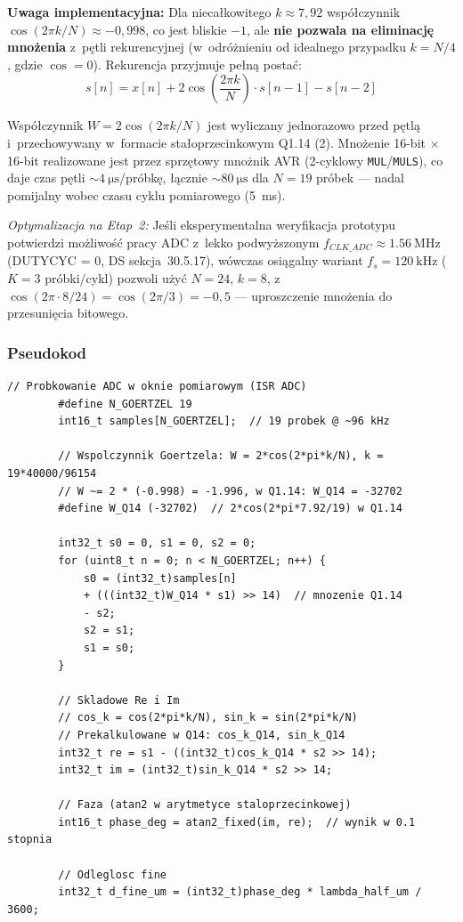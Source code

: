 \documentclass[a4paper,11pt]{article}
\begin{document}
	\textbf{Uwaga implementacyjna:} Dla niecałkowitego $k \approx 7{,}92$ współczynnik
	$\cos(2\pi k/N) \approx -0{,}998$, co jest bliskie $-1$, ale \textbf{nie pozwala
		na eliminację mnożenia} z~pętli rekurencyjnej (w~odróżnieniu od idealnego
	przypadku $k = N/4$, gdzie $\cos = 0$). Rekurencja przyjmuje pełną postać:
	\begin{equation}
		s[n] = x[n] + 2\cos\!\left(\frac{2\pi k}{N}\right) \cdot s[n-1] - s[n-2]
		\label{eq:goertzel_full}
	\end{equation}
	
	Współczynnik $W = 2\cos(2\pi k/N)$ jest wyliczany jednorazowo przed pętlą
	i~przechowywany w~formacie stałoprzecinkowym Q1.14 (\SI{2}{\byte}).
	Mnożenie 16-bit $\times$ 16-bit realizowane jest przez sprzętowy mnożnik AVR
	(2-cyklowy \texttt{MUL}/\texttt{MULS}), co daje czas pętli ${\sim}\SI{4}{\micro\second}$/próbkę,
	łącznie ${\sim}\SI{80}{\micro\second}$ dla $N = 19$ próbek --- nadal pomijalny
	wobec czasu cyklu pomiarowego (\SI{5}{\milli\second}).
	
	\textit{Optymalizacja na Etap~2:} Jeśli eksperymentalna weryfikacja prototypu
	potwierdzi możliwość pracy ADC z~lekko podwyższonym $f_{CLK\_ADC} \approx
	\SI{1,56}{\mega\hertz}$ (DUTYCYC = 0, DS sekcja~30.5.17), wówczas
	osiągalny wariant $f_s = \SI{120}{\kilo\hertz}$ ($K = 3$ próbki/cykl)
	pozwoli użyć $N = 24$, $k = 8$, z~$\cos(2\pi \cdot 8/24) = \cos(2\pi/3) = -0{,}5$
	--- uproszczenie mnożenia do przesunięcia bitowego.
	
	\subsubsection{Pseudokod}
	
	\begin{lstlisting}[caption={Algorytm Goertzela --- pelna rekurencja dla $k \approx 7{,}92$, $N = 19$},
		label={lst:goertzel}]
		// Probkowanie ADC w oknie pomiarowym (ISR ADC)
		#define N_GOERTZEL 19
		int16_t samples[N_GOERTZEL];  // 19 probek @ ~96 kHz
		
		// Wspolczynnik Goertzela: W = 2*cos(2*pi*k/N), k = 19*40000/96154
		// W ~= 2 * (-0.998) = -1.996, w Q1.14: W_Q14 = -32702
		#define W_Q14 (-32702)  // 2*cos(2*pi*7.92/19) w Q1.14
		
		int32_t s0 = 0, s1 = 0, s2 = 0;
		for (uint8_t n = 0; n < N_GOERTZEL; n++) {
			s0 = (int32_t)samples[n]
			+ (((int32_t)W_Q14 * s1) >> 14)  // mnozenie Q1.14
			- s2;
			s2 = s1;
			s1 = s0;
		}
		
		// Skladowe Re i Im
		// cos_k = cos(2*pi*k/N), sin_k = sin(2*pi*k/N)
		// Prekalkulowane w Q14: cos_k_Q14, sin_k_Q14
		int32_t re = s1 - ((int32_t)cos_k_Q14 * s2 >> 14);
		int32_t im = (int32_t)sin_k_Q14 * s2 >> 14;
		
		// Faza (atan2 w arytmetyce staloprzecinkowej)
		int16_t phase_deg = atan2_fixed(im, re);  // wynik w 0.1 stopnia
		
		// Odleglosc fine
		int32_t d_fine_um = (int32_t)phase_deg * lambda_half_um / 3600;
	\end{lstlisting}
	
\end{document}

